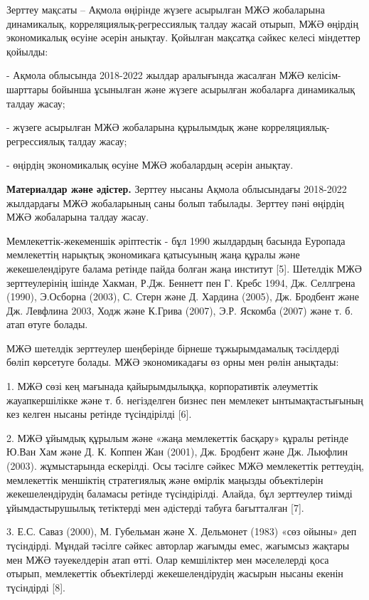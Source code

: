 Зерттеу мақсаты -- Ақмола өңірінде жүзеге асырылған МЖӘ жобаларына
динамикалық, корреляциялық-регрессиялық талдау жасай отырып, МЖӘ өңірдің
экономикалық өсуіне әсерін анықтау. Қойылған мақсатқа сәйкес келесі
міндеттер қойылды:

- Ақмола облысында 2018-2022 жылдар аралығында жасалған МЖӘ
келісім-шарттары бойынша ұсынылған және жүзеге асырылған жобаларға
динамикалық талдау жасау;

- жүзеге асырылған МЖӘ жобаларына құрылымдық және
корреляциялық-регрессиялық талдау жасау;

- өңірдің экономикалық өсуіне МЖӘ жобалардың әсерін анықтау.

{\bfseries Материалдар және әдістер.} Зерттеу нысаны Ақмола облысындағы
2018-2022 жылдардағы МЖӘ жобаларының саны болып табылады. Зерттеу пәні
өңірдің МЖӘ жобаларына талдау жасау.

Мемлекеттік-жекеменшік әріптестік - бұл 1990 жылдардың басында Еуропада
мемлекеттің нарықтық экономикаға қатысуының жаңа құралы және
жекешелендіруге балама ретінде пайда болған жаңа институт {[}5{]}.
Шетелдік МЖӘ зерттеулерінің ішінде Хакман, Р.Дж. Беннетт пен Г. Кребс
1994, Дж. Селлгрена (1990), Э.Осборна (2003), С. Стерн және Д. Хардина
(2005), Дж. Бродбент және Дж. Левфлина 2003, Ходж және К.Грива (2007),
Э.Р. Яскомба (2007) және т. б. атап өтуге болады.~

МЖӘ шетелдік зерттеулер шеңберінде бірнеше тұжырымдамалық тәсілдерді
бөліп көрсетуге болады. МЖӘ экономикадағы өз орны мен рөлін анықтады:

1. МЖӘ сөзі кең мағынада қайырымдылыққа, корпоративтік әлеуметтік
жауапкершілікке және т. б. негізделген бизнес пен мемлекет
ынтымақтастығының кез келген нысаны ретінде түсіндірілді {[}6{]}.

2. МЖӘ ұйымдық құрылым және «жаңа мемлекеттік басқару» құралы ретінде
Ю.Ван Хам және Д. К. Коппен Жан (2001), Дж. Бродбент және Дж. Льюфлин
(2003). жұмыстарында ескерілді. Осы тәсілге сәйкес МЖӘ мемлекеттік
реттеудің, мемлекеттік меншіктің стратегиялық және өмірлік маңызды
объектілерін жекешелендірудің баламасы ретінде түсіндірілді. Алайда, бұл
зерттеулер тиімді ұйымдастырушылық тетіктерді мен әдістерді табуға
бағытталған {[}7{]}.

3. Е.С. Саваз (2000), М. Губельман және Х. Дельмонет (1983) «сөз ойыны»
деп түсіндірді. Мұндай тәсілге сәйкес авторлар жағымды емес, жағымсыз
жақтары мен МЖӘ тәуекелдерін атап өтті. Олар кемшіліктер мен мәселелерді
қоса отырып, мемлекеттік объектілерді жекешелендірудің жасырын нысаны
екенін түсіндірді {[}8{]}.

